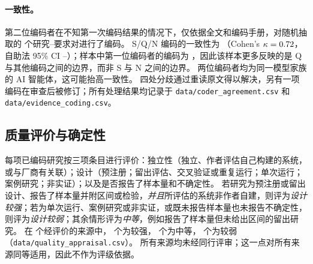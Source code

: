 \paragraph{一致性。}
第二位编码者在不知第一次编码结果的情况下，仅依据全文和编码手册，对随机抽取的 \nKappaN{} 个研究--要求对进行了编码。
S/Q/N 编码的一致性为 \nKappaAgree{}（Cohen's $\kappa = 0.72{}$，自助法 95\% CI \nKappaLo{}--\nKappaHi{}）；样本中第一位编码者的编码为 \nKappaMarg{}，因此该样本更多反映的是 Q 与其他编码之间的边界，而非 S 与 N 之间的边界。
两位编码者均为同一模型家族的 AI 智能体，这可能抬高一致性。
四处分歧通过重读原文得以解决，另有一项编码在审查后被修订；所有处理结果均记录于 \nolinkurl{data/coder_agreement.csv} 和 \nolinkurl{data/evidence_coding.csv}。

\subsection{质量评价与确定性}
\label{sec:appraisal}

每项已编码研究按三项条目进行评价：独立性（独立、作者评估自己构建的系统，或与厂商有关联）；设计（预注册；留出评估、交叉验证或重复运行；单次运行；案例研究；非实证）；以及是否报告了样本量和不确定性。
若研究为预注册或留出设计、报告了样本量并附区间或检验，\emph{并且}所评估的系统非作者自建，则评为\emph{设计较强}；若为单次运行、案例研究或非实证，或既未报告样本量也未报告不确定性，则评为\emph{设计较弱}；其余情形评为\emph{中等}，例如报告了样本量但未给出区间的留出研究。
在 \nAppraised{} 个经评价的来源中，\nStronger{} 个为较强，\nModerate{} 个为中等，\nWeaker{} 个为较弱（\nolinkurl{data/quality_appraisal.csv}）。
所有来源均未经同行评审；这一点对所有来源同等适用，因此不作为评级依据。

